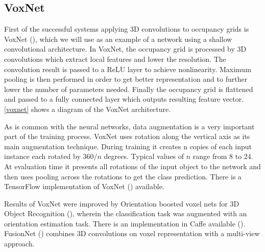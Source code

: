 \subsection{VoxNet}
First of the successful systems applying 3D convolutions to occupancy grids is VoxNet (\cite{maturana_voxnet:_2015}), which we will use as an example of a network using a shallow convolutional architecture. 
In VoxNet, the occupancy grid is processed by 3D convolutions which extract local features and lower the resolution. The convolution result is passed to a ReLU layer to achieve nonlinearity. Maximum pooling is then performed in order to get better representation and to further lower the number of parameters needed. Finally the occupancy grid is flattened and passed to a fully connected layer which outputs resulting feature vector. \autoref{voxnet} shows a diagram of the VoxNet architecture.\par  
As is common with the neural networks, data augmentation is a very important part of the training process. VoxNet uses rotation along the vertical axis as its main augmentation technique. During training it creates n copies of each input instance each rotated by $360/n$ degrees. Typical values of $n$ range from 8 to 24. At evaluation time it presents all rotations of the input object to the network and then uses pooling across the rotations to get the class prediction. There is a TensorFlow implementation of VoxNet (\cite{maturana_voxnet_2016}) available.\par
Results of VoxNet were improved by Orientation boosted voxel nets for 3D Object Recognition (\cite{sedaghat_orientation-boosted_2016}), wherein the classification task was augmented
with an orientation estimation task. There is an implementation in Caffe available (\cite{sedaghat_orion_2016}). FusionNet (\cite{hegde_fusionnet:_2016}) combines 3D convolutions on voxel representation with a multi-view approach.



